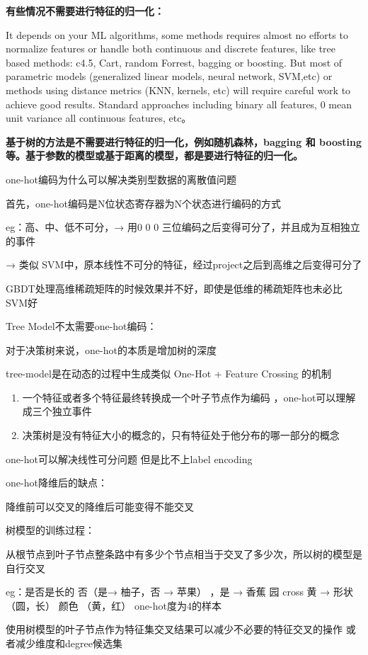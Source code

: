 \documentclass[10pt,a4paper]{ctexbook}
\begin{document}
\textbf{有些情况不需要进行特征的归一化：}

It depends on your ML algorithms, some methods requires almost no efforts to normalize features or handle both continuous and discrete features, like tree based methods: c4.5, Cart, random Forrest, bagging or boosting. But most of parametric models (generalized linear models, neural network, SVM,etc) or methods using distance metrics (KNN, kernels, etc) will require careful work to achieve good results. Standard approaches including binary all features, 0 mean unit variance all continuous features, etc。

\textbf{基于树的方法是不需要进行特征的归一化，例如随机森林，bagging 和 boosting等。基于参数的模型或基于距离的模型，都是要进行特征的归一化。}

one-hot编码为什么可以解决类别型数据的离散值问题 

首先，one-hot编码是N位状态寄存器为N个状态进行编码的方式 

eg：高、中、低不可分，→ 用0 0 0 三位编码之后变得可分了，并且成为互相独立的事件 

→ 类似 SVM中，原本线性不可分的特征，经过project之后到高维之后变得可分了 

GBDT处理高维稀疏矩阵的时候效果并不好，即使是低维的稀疏矩阵也未必比SVM好 

Tree Model不太需要one-hot编码： 

对于决策树来说，one-hot的本质是增加树的深度 

tree-model是在动态的过程中生成类似 One-Hot + Feature Crossing 的机制 
\begin{enumerate}
\item 一个特征或者多个特征最终转换成一个叶子节点作为编码 ，one-hot可以理解成三个独立事件 
\item 决策树是没有特征大小的概念的，只有特征处于他分布的哪一部分的概念 
\end{enumerate}
one-hot可以解决线性可分问题 但是比不上label encoding 

one-hot降维后的缺点： 

降维前可以交叉的降维后可能变得不能交叉 

树模型的训练过程： 

从根节点到叶子节点整条路中有多少个节点相当于交叉了多少次，所以树的模型是自行交叉 

eg：是否是长的 { 否（是→ 柚子，否 → 苹果） ，是 → 香蕉 } 园 cross 黄 → 形状 （圆，长） 颜色 （黄，红） one-hot度为4的样本 

使用树模型的叶子节点作为特征集交叉结果可以减少不必要的特征交叉的操作 或者减少维度和degree候选集 
\end{document}
